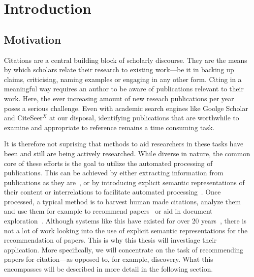 \chapter{Introduction}\label{chap:introduction}
\section{Motivation}
Citations are a central building block of scholarly discourse. They are the means by which scholars relate their research to existing work---be it in backing up claims, criticising, naming examples or engaging in any other form. Citing in a meaningful way requires an author to be aware of publications relevant to their work.
Here, the ever increasing amount of new reseach publications per year poses a serious challenge. Even with academic search engines like Goolge Scholar and CiteSeer$^X$ at our disposal, identifying publications that are worthwhile to examine and appropriate to reference remains a time consuming task.

It is therefore not suprising that methods to aid researchers in these tasks have been and still are being actively researched. While diverse in nature, the common core of these efforts is the goal to utilize the automated processing of publications. This can be achieved by either extracting information from publications as they are~\cite{Nasar2018,Beel2016}, or by introducing explicit semantic representations of their content or interrelations to facilitate automated processing~\cite{BuckinghamShum2000,Schneider2013,Jaradeh2019}. %
Once processed, a typical method is to harvest human made citations, analyze them~\cite{Abujbara2013,Teufel2006a} and use them for example to recommend papers~\cite{Beel2016} or aid in document exploration~\cite{Berger2016}. Although systems like this have existed for over 20 years~\cite{Bollacker1998,Beel2016}, there is not a lot of work looking into the use of explicit semantic representations for the recommendation of papers.
This is why this thesis will investiage their application. More specifically, we will concentrate on the task of recommending papers for citation---as opposed to, for example, discovery. What this encompasses will be described in more detail in the following section.

